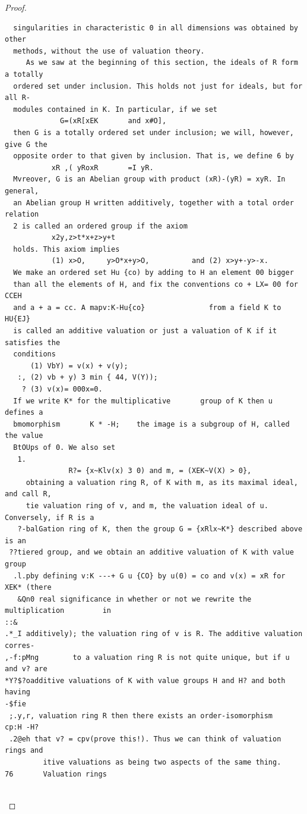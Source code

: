 \begin{proof}
\begin{verbatim}
  singularities in characteristic 0 in all dimensions was obtained by other
  methods, without the use of valuation theory.
     As we saw at the beginning of this section, the ideals of R form a totally
  ordered set under inclusion. This holds not just for ideals, but for all R-
  modules contained in K. In particular, if we set
             G=(xR[xEK       and x#O],
  then G is a totally ordered set under inclusion; we will, however, give G the
  opposite order to that given by inclusion. That is, we define 6 by
           xR ,( yRoxR       =I yR.
  Mvreover, G is an Abelian group with product (xR)-(yR) = xyR. In general,
  an Abelian group H written additively, together with a total order relation
  2 is called an ordered group if the axiom
           x2y,z>t*x+z>y+t
  holds. This axiom implies
           (1) x>O,     y>O*x+y>O,          and (2) x>y+-y>-x.
  We make an ordered set Hu {co) by adding to H an element 00 bigger
  than all the elements of H, and fix the conventions co + LX= 00 for CCEH
  and a + a = cc. A mapv:K-Hu{co}               from a field K to HU{EJ}
  is called an additive valuation or just a valuation of K if it satisfies the
  conditions
      (1) VbY) = v(x) + v(y);
   :, (2) vb + y) 3 min { 44, V(Y));
    ? (3) v(x)= 000x=0.
  If we write K* for the multiplicative       group of K then u defines a
  bmomorphism       K * -H;    the image is a subgroup of H, called the value
  BtOUps of 0. We also set
   1.
               R?= {x~Klv(x) 3 0) and m, = (XEK~V(X) > 0},
     obtaining a valuation ring R, of K with m, as its maximal ideal, and call R,
     tie valuation ring of v, and m, the valuation ideal of u. Conversely, if R is a
   ?-balGation ring of K, then the group G = {xRlx~K*} described above is an
 ??tiered group, and we obtain an additive valuation of K with value group
  .l.pby defining v:K ---+ G u {CO} by u(0) = co and v(x) = xR for XEK* (there
   &Qn0 real significance in whether or not we rewrite the multiplication         in
::&
.*_I additively); the valuation ring of v is R. The additive valuation corres-
,-f:pMng        to a valuation ring R is not quite unique, but if u and v? are
*Y?$?oadditive valuations of K with value groups H and H? and both having
-$fie
 ;.y,r, valuation ring R then there exists an order-isomorphism        cp:H -H?
 .2@eh that v? = cpv(prove this!). Thus we can think of valuation rings and
         itive valuations as being two aspects of the same thing.
76       Valuation rings


\end{verbatim}
\end{proof}
